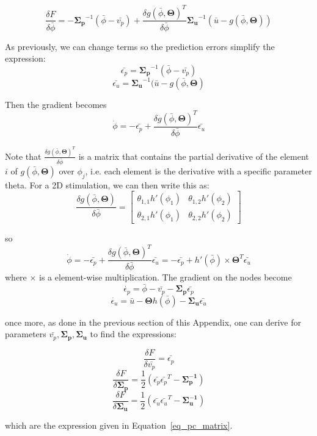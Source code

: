 $$
\frac{\delta F}{\delta \bar{\phi}} =
-
\boldsymbol{\Sigma_p}^{-1}  (\bar{\phi} - \bar{v_p}) +
\frac{\delta g(\bar{\phi}, \boldsymbol{\Theta})^T}{\delta \bar{\phi}}\boldsymbol{\Sigma_u}^{-1}  (\bar{u} - g(\bar{\phi}, \boldsymbol{\Theta}))
$$

As previously, we can change terms so the prediction errors simplify the expression:
$$
\bar{\epsilon_p} = \boldsymbol{\Sigma_p}^{-1}(\bar{\phi}-\bar{v_p})
$$
$$
\bar{\epsilon_u} = \boldsymbol{\Sigma_u}^{-1}  (\bar{u} - g(\bar{\phi}, \boldsymbol{\Theta})
$$

Then the gradient becomes 
$$
\dot{\phi} = - \bar{\epsilon_p} + \frac{\delta g(\bar{\phi}, \boldsymbol{\Theta})^T}{\delta \bar{\phi}} \bar{\epsilon_u}
$$

Note that $\frac{\delta g(\bar{\phi}, \boldsymbol{\Theta})^T}{\delta \bar{\phi}}$ is a matrix that contains the partial derivative of the element $i$ of $g(\bar{\phi}, \boldsymbol{\Theta})$ over $\phi_j$, i.e. each element is the derivative with a specific parameter theta. For a 2D stimulation, we can then write this as: 
$$
\frac{\delta g(\bar{\phi}, \boldsymbol{\Theta})}{\delta \bar{\phi}} = 
\begin{bmatrix}
    \theta_{1,1}h'(\phi_1) & \theta_{1,2}h'(\phi_2) \\
    \theta_{2,1}h'(\phi_1) & \theta_{2,2}h'(\phi_2) 
  \end{bmatrix}
$$

so 
$$
\dot{\phi} = - \bar{\epsilon_p} + \frac{\delta g(\bar{\phi}, \boldsymbol{\Theta})^T}{\delta \bar{\phi}} \bar{\epsilon_u}
= - \bar{\epsilon_p} + h'(\bar{\phi}) \times \boldsymbol{\Theta}^T \bar{\epsilon_u}
$$
where $\times$ is a element-wise multiplication. The gradient on the nodes become
$$
\dot{\epsilon_p} = \bar{\phi} - \bar{v_p} - \boldsymbol{\Sigma_p}\bar{\epsilon_p}
$$
$$
\dot{\epsilon_u} = \bar{u} - \boldsymbol{\Theta}h(\bar{\phi}) - \boldsymbol{\Sigma_u}\bar{\epsilon_u}
$$

once more, as done in the previous section of this Appendix, one can derive for parameters $\bar{v_p}, \boldsymbol{\Sigma_p},  \boldsymbol{\Sigma_u}$ to find the expressions:

$$
\frac{\delta F}{\delta \bar{v_p}} =
\bar{\epsilon_p}
$$
$$
\frac{\delta F}{\delta \boldsymbol{\Sigma_p}} =
\frac{1}{2}(\bar{\epsilon_p}\bar{\epsilon_p}^T - \boldsymbol{\Sigma_p^{-1}})
$$
$$
\frac{\delta F}{\delta \boldsymbol{\Sigma_u}} =
\frac{1}{2}(\bar{\epsilon_u}\bar{\epsilon_u}^T - \boldsymbol{\Sigma_u^{-1}})
$$

which are the expression given in Equation~\ref{eq_pc_matrix}.

